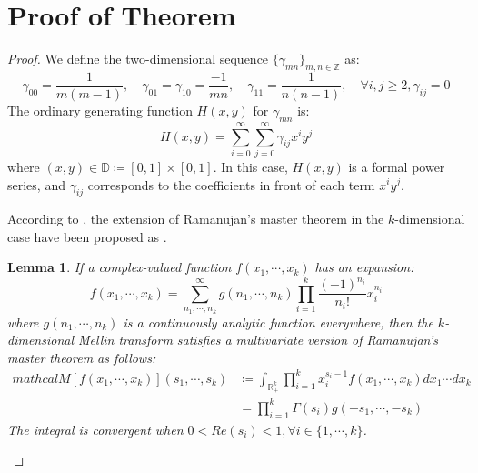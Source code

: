 \documentclass{article}
\newtheorem{lemma}{Lemma}[section]
\begin{document}
\section{Proof of Theorem}\label{proof:gamma_c}
\begin{proof}
We define the two-dimensional sequence $\{\gamma_{mn}\}_{m,n\in\mathbb{Z}}$ as:
\begin{equation}
    \gamma_{00} = \frac{1}{m(m-1)}, \quad \gamma_{01} = \gamma_{10} = \frac{-1}{mn}, \quad \gamma_{11} = \frac{1}{n(n-1)}, \quad \forall i, j \geq 2, \gamma_{ij} = 0
\end{equation}
The ordinary generating function $H(x, y)$ for $\gamma_{mn}$ is:
\begin{equation}
    H(x, y) = \sum_{i=0}^{\infty}\sum_{j=0}^{\infty}\gamma_{ij}x^iy^j
\end{equation}
where $(x, y) \in \mathbb{D} \coloneqq [0, 1]\times [0, 1]$.
In this case, $H(x, y)$ is a formal power series, and $\gamma_{ij}$ corresponds to the coefficients in front of each term $x^iy^j$.

According to \cite{bradshaw2023operational,amdeberhan2012ramanujan}, the extension of Ramanujan's master theorem in the $k$-dimensional case have been proposed as .
\begin{lemma}\label{le:MultiRam}
    If a complex-valued function $f(x_1, \cdots, x_k)$ has an expansion:
    \begin{equation}
        f(x_1, \cdots, x_k) = \sum_{n_1, \cdots, n_k}^{\infty} g(n_1, \cdots, n_k) \prod_{i=1}^k \frac{(-1)^{n_i}}{n_i!} x_i^{n_i}
    \end{equation}
    where $g(n_1, \cdots, n_k)$ is a continuously analytic function everywhere, 
    then the $k$-dimensional Mellin transform satisfies a multivariate version of Ramanujan's master theorem as follows:
    \begin{equation}
        \begin{aligned}
            mathcal{M}[f(x_1, \cdots, x_k)](s_1, \cdots, s_k) & \coloneqq \int_{\mathbb{R}_+^k} \prod_{i=1}^{k} x_i^{s_i-1} f(x_1, \cdots, x_k) dx_1 \cdots dx_k \\
            & = \prod_{i=1}^{k} \Gamma(s_i)g(-s_1, \cdots, -s_k)
        \end{aligned}
    \end{equation}
    The integral is convergent when $0 < Re(s_i) <1, \forall i \in \{1,\cdots,k\}$.
\end{lemma}


\end{proof}
\end{document}

